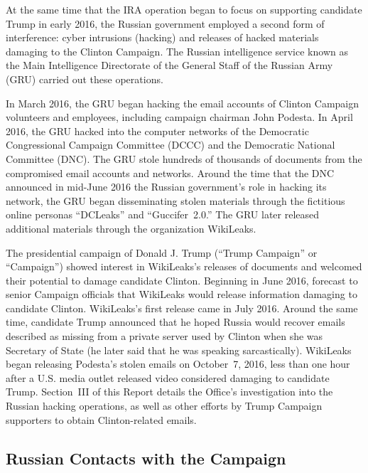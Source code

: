 At the same time that the IRA operation began to focus on supporting candidate Trump in early 2016, the Russian government employed a second form of interference: cyber intrusions (hacking) and releases of hacked materials damaging to the Clinton Campaign.
The Russian intelligence service known as the Main Intelligence Directorate of the General Staff of the Russian Army (GRU) carried out these operations.

In March 2016, the GRU began hacking the email accounts of Clinton Campaign volunteers and employees, including campaign chairman John Podesta.
In April 2016, the GRU hacked into the computer networks of the Democratic Congressional Campaign Committee (DCCC) and the Democratic National Committee (DNC).
The GRU stole hundreds of thousands of documents from the compromised email accounts and networks.
Around the time that the DNC announced in mid-June 2016 the Russian government's role in hacking its network, the GRU began disseminating stolen materials through the fictitious online personas ``DCLeaks'' and ``Guccifer~2.0.''
The GRU later released additional materials through the organization WikiLeaks.

The presidential campaign of Donald J. Trump (``Trump Campaign'' or ``Campaign'') showed interest in WikiLeaks's releases of documents and welcomed their potential to damage candidate Clinton. Beginning in June 2016,  forecast to senior Campaign officials that WikiLeaks would release information damaging to candidate Clinton.
WikiLeaks's first release came in July 2016.
Around the same time, candidate Trump announced that he hoped Russia would recover emails described as missing from a private server used by Clinton when she was Secretary of State (he later said that he was speaking sarcastically).
 WikiLeaks began releasing Podesta's stolen emails on October~7, 2016, less than one hour after a U.S. media outlet released video considered damaging to candidate Trump.
Section~III of this Report details the Office's investigation into the Russian hacking operations, as well as other efforts by Trump Campaign supporters to obtain Clinton-related emails.

\subsection*{Russian Contacts with the Campaign}

